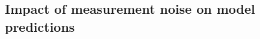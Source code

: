 \documentclass[final,  3p]{elsarticle}
\begin{document}



%
\subsection{Impact of measurement noise on model predictions}
\label{sec:epsilon}
\end{document}
